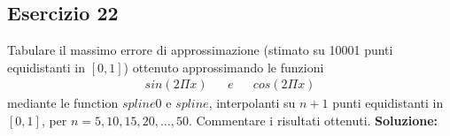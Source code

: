 \subsection{Esercizio 22}
Tabulare il massimo errore di approssimazione (stimato su 10001 punti equidistanti
in $[0, 1]$) ottenuto approssimando le funzioni
\[
    \begin{array}{ccccc}
        sin(2\Pi x) & & e & & cos(2\Pi x)
    \end{array}
\]
mediante le function $spline0$ e $spline$, interpolanti su $n + 1$ punti equidistanti in $[0, 1]$,
per $n = 5, 10, 15, 20, \dots, 50$. Commentare i risultati ottenuti.
\newline \textbf{Soluzione:} \newline

